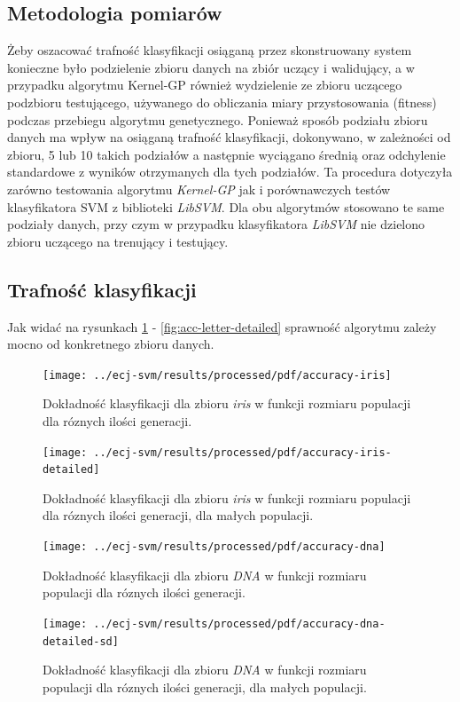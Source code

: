 \documentclass{article}
\begin{document}
	\subsection{Metodologia pomiarów}
	Żeby oszacować trafność klasyfikacji osiąganą przez skonstruowany system konieczne było podzielenie zbioru danych na zbiór uczący i walidujący, a w przypadku algorytmu Kernel-GP również wydzielenie ze zbioru uczącego podzbioru testującego, używanego do obliczania miary przystosowania (fitness) podczas przebiegu algorytmu genetycznego. Ponieważ sposób podziału zbioru danych ma wpływ na osiąganą trafność klasyfikacji, dokonywano, w zależności od zbioru, 5 lub 10 takich podziałów a następnie wyciągano średnią oraz odchylenie standardowe z wyników otrzymanych dla tych podziałów. Ta procedura dotyczyła zarówno testowania algorytmu \emph{Kernel-GP} jak i porównawczych testów klasyfikatora SVM z biblioteki \emph{LibSVM}. Dla obu algorytmów stosowano te same podziały danych, przy czym w przypadku klasyfikatora \emph{LibSVM} nie dzielono zbioru uczącego na trenujący i testujący.
	

	\subsection{Trafność klasyfikacji}
	Jak widać na rysunkach \ref{fig:acc-iris} - \ref{fig:acc-letter-detailed} sprawność algorytmu zależy mocno od konkretnego zbioru danych.
	\begin{figure}[ht]
		\texttt{[image: ../ecj-svm/results/processed/pdf/accuracy-iris]}
		\caption{Dokładność klasyfikacji dla zbioru \emph{iris} w funkcji rozmiaru populacji dla róznych ilości generacji.\label{fig:acc-iris}}
	\end{figure}
	
	\begin{figure}[ht]
		\texttt{[image: ../ecj-svm/results/processed/pdf/accuracy-iris-detailed]}
		\caption{Dokładność klasyfikacji dla zbioru \emph{iris} w funkcji rozmiaru populacji dla róznych ilości generacji, dla małych populacji.	\label{fig:acc-iris-detailed}}
	\end{figure}	
	
	
		\begin{figure}[ht]
		\texttt{[image: ../ecj-svm/results/processed/pdf/accuracy-dna]}
		\caption{Dokładność klasyfikacji dla zbioru \emph{DNA} w funkcji rozmiaru populacji dla róznych ilości generacji.\label{fig:acc-dna}}
	\end{figure}
	
		\begin{figure}[ht]
		\texttt{[image: ../ecj-svm/results/processed/pdf/accuracy-dna-detailed-sd]}
		\caption{Dokładność klasyfikacji dla zbioru \emph{DNA} w funkcji rozmiaru populacji dla róznych ilości generacji, dla małych populacji.\label{fig:acc-dna-detailed}}
	\end{figure}	
	
\end{document}
